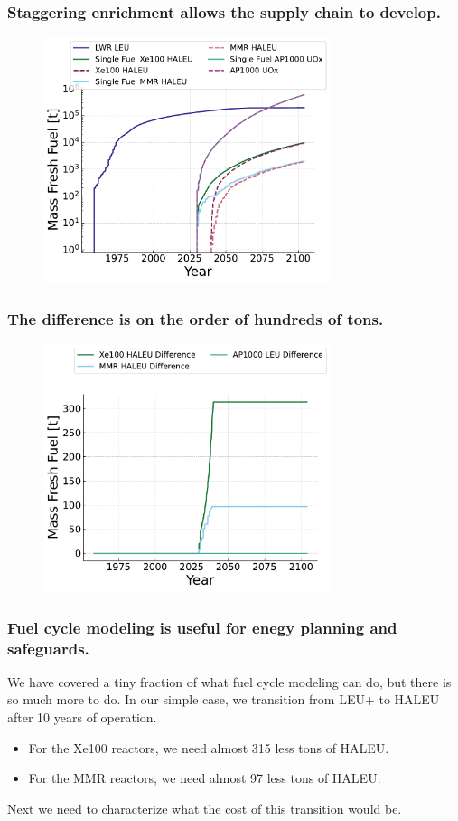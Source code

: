 \documentclass[9pt]{beamer}
\begin{document}
  \begin{frame}
    \frametitle{Staggering enrichment allows the supply chain to develop.}
    \begin{figure}
        \centering
        \includegraphics[width=0.75\textwidth]{images/fresh_fuel.pdf}
    \end{figure}
  \end{frame}

  \begin{frame}
    \frametitle{The difference is on the order of hundreds of tons.}
    \begin{figure}
        \centering
        \includegraphics[width=0.75\textwidth]{images/fresh_fuel_difference.pdf}
    \end{figure}
  \end{frame}

  \begin{frame}
      \frametitle{Fuel cycle modeling is useful for enegy planning and safeguards.}
      We have covered a tiny fraction of what fuel cycle modeling can do, but there is so much more to do. In our simple case, we transition from LEU+ to HALEU after 10 years of operation.
      \begin{itemize}
          \item For the Xe100 reactors, we need almost 315 less tons of HALEU.
          \item For the MMR reactors, we need almost 97 less tons of HALEU.
      \end{itemize}
      Next we need to characterize what the cost of this transition would be.
  \end{frame}
\end{document}
